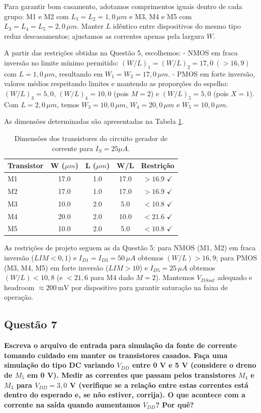 ﻿\documentclass[12pt,a4paper]{article}
\begin{document}
Para garantir bom casamento, adotamos comprimentos iguais dentro de cada grupo: M1 e M2 com $L_1=L_2=1{,}0\,\mu m$ e M3, M4 e M5 com $L_3=L_4=L_5=2{,}0\,\mu m$. Manter $L$ idêntico entre dispositivos do mesmo tipo reduz descasamentos; ajustamos as correntes apenas pela largura $W$.

A partir das restrições obtidas na Questão 5, escolhemos:
- NMOS em fraca inversão no limite mínimo permitido: $(W/L)_1 = (W/L)_2 = 17{,}0\ (>16{,}9)$ com $L=1{,}0\,\mu m$, resultando em $W_1=W_2=17{,}0\,\mu m$.
- PMOS em forte inversão, valores médios respeitando limites e mantendo as proporções do espelho: $(W/L)_3 = 5{,}0$, $(W/L)_4 = 10{,}0$ (pois $M=2$) e $(W/L)_5 = 5{,}0$ (pois $X=1$). Com $L=2{,}0\,\mu m$, temos $W_3=10{,}0\,\mu m$, $W_4=20{,}0\,\mu m$ e $W_5=10{,}0\,\mu m$.

As dimensões determinadas são apresentadas na Tabela \ref{tab:dimensoes}.

\begin{table}[H]
\centering
\caption{Dimensões dos transistores do circuito gerador de corrente para $I_S = 25\mu A$.}
\label{tab:dimensoes}
\begin{tabular}{@{}lcccc@{}}
    \toprule
    \textbf{Transistor} & \textbf{W ($\mu m$)} & \textbf{L ($\mu m$)} & \textbf{W/L} & \textbf{Restrição} \\\midrule
M1 & 17.0 & 1.0 & 17.0 & $> 16.9$ $\checkmark$ \\
M2 & 17.0 & 1.0 & 17.0 & $> 16.9$ $\checkmark$ \\
M3 & 10.0 & 2.0 & 5.0 & $< 10.8$ $\checkmark$ \\
M4 & 20.0 & 2.0 & 10.0 & $< 21.6$ $\checkmark$ \\
M5 & 10.0 & 2.0 & 5.0 & $< 10.8$ $\checkmark$ \\
\bottomrule
\end{tabular}
\end{table}

As restrições de projeto seguem as da Questão 5: para NMOS (M1, M2) em fraca inversão ($LIM<0{,}1$) e $I_{D1}=I_{D3}=50\,\mu A$ obtemos $(W/L)>16{,}9$; para PMOS (M3, M4, M5) em forte inversão ($LIM>10$) e $I_{D5}=25\,\mu A$ obtemos $(W/L)<10{,}8$ (e $<21{,}6$ para M4 dado $M=2$). Mantemos $V_{DSsat}$ adequado e headroom $\approx 200\,\text{mV}$ por dispositivo para garantir saturação na faixa de operação.

\subsection*{Questão 7}
    \textbf{Escreva o arquivo de entrada para simulação da fonte de corrente tomando cuidado em manter os transistores casados. Faça uma simulação do tipo DC variando $V_{DD}$ entre 0 V e 5 V (considere o dreno de $M_5$ em 0 V). Medir as correntes que passam pelos transistores $M_4$ e $M_3$ para $V_{DD} = 3{,}0$ V (verifique se a relação entre estas correntes está dentro do esperado e, se não estiver, corrija). O que acontece com a corrente na saída quando aumentamos $V_{DD}$? Por quê?}
\end{document}
